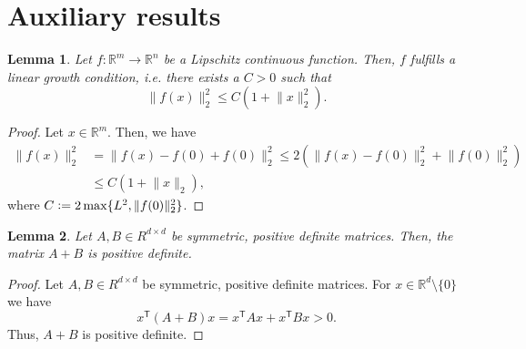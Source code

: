 \documentclass[12pt]{article}
\newtheorem{lemma}[lemma]{Lemma}
\theoremstyle{definition}
\numberwithin{equation}{section}
\newcommand{\R}{\mathbb{R}}
\newcommand{\T}{\mathsf{T}}
\newcommand{\norm}[1]{\lVert{#1}\rVert_2}
\newcommand{\defeq}{\vcentcolon=}
\begin{document}
\section{Auxiliary results}
\begin{lemma}
  \label{lemma:linear_growth}
  Let $f : \R^m \rightarrow \R^n$ be a Lipschitz continuous function. Then, $f$ fulfills a linear growth condition, i.e. there exists a $C > 0$ such that 
  \begin{equation*}
    \norm{f(x)}^2 \leq C (1 + \norm{x}^2).
  \end{equation*}
\end{lemma}
\begin{proof}
  Let $x \in \R^m$. Then, we have
  \begin{align*}
    \norm{f(x)}^2 &= \norm{f(x) - f(0) + f(0)}^2 \leq 2 \left( \norm{f(x) - f(0)}^2 + \norm{f(0)}^2\right) \\
    &\leq C(1+\norm{x}),
  \end{align*}
  where $C \defeq 2\max\{L^2, \norm{f(0)}^2\}$.
\end{proof}
\begin{lemma}
  \label{lem:sum_positive_definite}
  Let $A,B \in R^{d \times d}$ be symmetric, positive definite matrices. Then, the matrix $A+B$ is positive definite.
\end{lemma}
\begin{proof}
  Let $A,B \in R^{d \times d}$ be symmetric, positive definite matrices. For $x \in \R^d \setminus \{0\}$ we have
  \begin{equation*}
    x^\T(A+B)x = x^\T A x + x^\T B x > 0.
  \end{equation*}
  Thus, $A+B$ is positive definite.
\end{proof}
\end{document}
